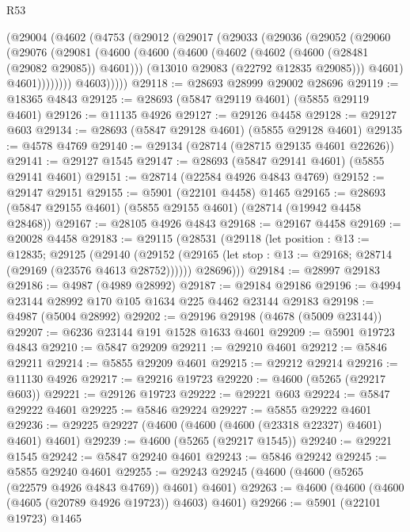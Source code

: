 \begin{lexlean}{R53}
\begin{coremodule}
      (@29004
        (@4602
          (@4753
            (@29012
              (@29017
                (@29033
                  (@29036
                    (@29052
                      (@29060
                        (@29076
                          (@29081
                            (@4600
                              (@4600
                                (@4600
                                  (@4602 (@4602 (@4600 (@28481 (@29082 @29085)) @4601)))
                                  (@13010 @29083 (@22792 @12835 @29085)))
                                @4601)
                              @4601))))))))
              @4603)))))
@29118 := @28693 @28999 @29002 @28696
@29119 := @18365 @4843
@29125 := @28693 (@5847 @29119 @4601) (@5855 @29119 @4601)
@29126 := @11135 @4926
@29127 := @29126 @4458
@29128 := @29127 @603
@29134 := @28693 (@5847 @29128 @4601) (@5855 @29128 @4601)
@29135 := @4578 @4769
@29140 := @29134 (@28714 (@28715 @29135 @4601 @22626))
@29141 := @29127 @1545
@29147 := @28693 (@5847 @29141 @4601) (@5855 @29141 @4601)
@29151 := @28714 (@22584 @4926 @4843 @4769)
@29152 := @29147 @29151
@29155 := @5901 (@22101 @4458) @1465
@29165 := @28693 (@5847 @29155 @4601) (@5855 @29155 @4601) (@28714 (@19942 @4458 @28468))
@29167 := @28105 @4926 @4843
@29168 := @29167 @4458
@29169 := @20028 @4458
@29183 := @29115
    (@28531
      (@29118
        (let position : @13 := @12835;
        @29125
          (@29140
            (@29152 (@29165 (let stop : @13 := @29168; @28714 (@29169 (@23576 @4613 @28752))))))
          @28696)))
@29184 := @28997 @29183
@29186 := @4987 (@4989 @28992)
@29187 := @29184 @29186
@29196 := @4994 @23144 @28992 @170 @105 @1634 @225 @4462 @23144 @29183
@29198 := @4987 (@5004 @28992)
@29202 := @29196 @29198 (@4678 (@5009 @23144))
@29207 := @6236 @23144 @191 @1528 @1633 @4601
@29209 := @5901 @19723 @4843
@29210 := @5847 @29209
@29211 := @29210 @4601
@29212 := @5846 @29211
@29214 := @5855 @29209 @4601
@29215 := @29212 @29214
@29216 := @11130 @4926
@29217 := @29216 @19723
@29220 := @4600 (@5265 (@29217 @603))
@29221 := @29126 @19723
@29222 := @29221 @603
@29224 := @5847 @29222 @4601
@29225 := @5846 @29224
@29227 := @5855 @29222 @4601
@29236 := @29225 @29227 (@4600 (@4600 (@4600 (@23318 @22327) @4601) @4601) @4601)
@29239 := @4600 (@5265 (@29217 @1545))
@29240 := @29221 @1545
@29242 := @5847 @29240 @4601
@29243 := @5846 @29242
@29245 := @5855 @29240 @4601
@29255 := @29243 @29245 (@4600 (@4600 (@5265 (@22579 @4926 @4843 @4769)) @4601) @4601)
@29263 := @4600 (@4600 (@4600 (@4605 (@20789 @4926 @19723)) @4603) @4601)
@29266 := @5901 (@22101 @19723) @1465

\end{coremodule}
\end{lexlean}

